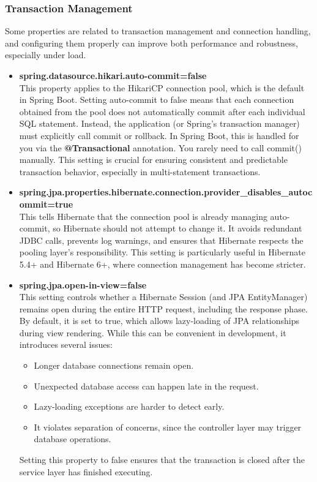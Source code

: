 \subsubsection{Transaction Management}

Some properties are related to transaction management and connection handling, and configuring them properly can improve both performance and robustness, especially under load.

\begin{itemize}
\item \textbf{spring.datasource.hikari.auto-commit=false}\\
This property applies to the HikariCP connection pool, which is the default in Spring Boot.
Setting auto-commit to false means that each connection obtained from the pool does not automatically commit after each individual SQL statement.
Instead, the application (or Spring’s transaction manager) must explicitly call commit or rollback. In Spring Boot, this is handled for you via the \textbf{@Transactional} annotation. You rarely need to call commit() manually.
This setting is crucial for ensuring consistent and predictable transaction behavior, especially in multi-statement transactions.


\item \textbf{spring.jpa.properties.hibernate.connection.provider\_disables\_autocommit=true}\\
This tells Hibernate that the connection pool is already managing auto-commit, so Hibernate should not attempt to change it.
It avoids redundant JDBC calls, prevents log warnings, and ensures that Hibernate respects the pooling layer's responsibility.
This setting is particularly useful in Hibernate 5.4+ and Hibernate 6+, where connection management has become stricter.

\item \textbf{spring.jpa.open-in-view=false}\\
This setting controls whether a Hibernate Session (and JPA EntityManager) remains open during the entire HTTP request, including the response phase.
By default, it is set to true, which allows lazy-loading of JPA relationships during view rendering. While this can be convenient in development, it introduces several issues:

\begin{itemize}
\item Longer database connections remain open.
\item Unexpected database access can happen late in the request.
\item Lazy-loading exceptions are harder to detect early.
\item It violates separation of concerns, since the controller layer may trigger database operations.
\end{itemize}
Setting this property to false ensures that the transaction is closed after the service layer has finished executing.


\end{itemize}
